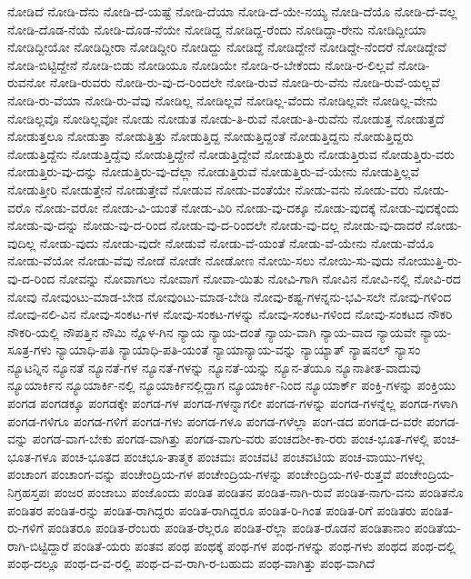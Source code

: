 {ನೋಡಿದೆ
ನೋಡಿ-ದೆನು
ನೋಡಿ-ದೆ-ಯಷ್ಟೆ
ನೋಡಿ-ದೆಯಾ
ನೋಡಿ-ದೆ-ಯೇ-ನಯ್ಯ
ನೋಡಿ-ದೆಯೊ
ನೋಡಿ-ದೆ-ವಲ್ಲ
ನೋಡಿ-ದೊಡ-ನೆಯೆ
ನೋಡಿ-ದೊಡ-ನೆಯೇ
ನೋಡಿದ್ದ
ನೋಡಿದ್ದ-ರೆಂದು
ನೋಡಿದ್ದಾ-ರೇನು
ನೋಡಿದ್ದೀಯಾ
ನೋಡಿದ್ದೀಯೋ
ನೋಡಿದ್ದೀರಾ
ನೋಡಿದ್ದೀರಿ
ನೋಡಿದ್ದು
ನೋಡಿದ್ದೆ
ನೋಡಿದ್ದೇನೆ
ನೋಡಿದ್ದೇ-ನೆಂದರೆ
ನೋಡಿದ್ದೇವೆ
ನೋಡಿ-ಬಿಟ್ಟಿದ್ದೇನೆ
ನೋಡಿ-ಬಿಡು
ನೋಡಿಯೂ
ನೋಡಿಯೇ
ನೋಡಿ-ರ-ಬೇಕೆಂದು
ನೋಡಿ-ರ-ಲಿಲ್ಲವೆ
ನೋಡಿ-ರುವನೋ
ನೋಡಿ-ರುವರು
ನೋಡಿ-ರು-ವು-ದ-ರಿಂದಲೇ
ನೋಡಿ-ರುವೆ
ನೋಡಿ-ರು-ವೆನು
ನೋಡಿ-ರುವೆ-ಯಲ್ಲವೆ
ನೋಡಿ-ರು-ವೆಯಾ
ನೋಡಿ-ರು-ವೆವು
ನೋಡಿಲ್ಲ
ನೋಡಿಲ್ಲವೆ
ನೋಡಿಲ್ಲ-ವೆಂದು
ನೋಡಿಲ್ಲವೇ
ನೋಡಿಲ್ಲ-ವೇನು
ನೋಡಿಲ್ಲವೊ
ನೋಡಿಲ್ಲವೋ
ನೋಡು
ನೋಡುತ
ನೋಡು-ತಿ-ರುವೆ
ನೋಡು-ತಿ-ರುವೆನು
ನೋಡುತ್ತ
ನೋಡುತ್ತದೆ
ನೋಡುತ್ತಲೂ
ನೋಡುತ್ತಾ
ನೋಡುತ್ತಿತ್ತು
ನೋಡುತ್ತಿದ್ದ
ನೋಡುತ್ತಿದ್ದಂತೆ
ನೋಡುತ್ತಿದ್ದನು
ನೋಡುತ್ತಿದ್ದರು
ನೋಡುತ್ತಿದ್ದೆನು
ನೋಡುತ್ತಿದ್ದೆವು
ನೋಡುತ್ತಿದ್ದೇನೆ
ನೋಡುತ್ತಿದ್ದೇವೆ
ನೋಡುತ್ತಿರು
ನೋಡುತ್ತಿರುವ
ನೋಡುತ್ತಿರು-ವರು
ನೋಡುತ್ತಿರು-ವು-ದನ್ನು
ನೋಡುತ್ತಿರು-ವು-ದೆಲ್ಲಾ
ನೋಡುತ್ತಿರುವೆ
ನೋಡುತ್ತಿರು-ವೆ-ಯೇನು
ನೋಡುತ್ತಿಲ್ಲವೆ
ನೋಡುತ್ತೀರಿ
ನೋಡುತ್ತೇನೆ
ನೋಡುತ್ತೇವೆ
ನೋಡುವ
ನೋಡು-ವಂತೆಯೇ
ನೋಡು-ವನು
ನೋಡು-ವರು
ನೋಡು-ವರೊ
ನೋಡು-ವರೋ
ನೋಡು-ವಿ-ಯಂತೆ
ನೋಡು-ವಿರಿ
ನೋಡು-ವು-ದಕ್ಕೂ
ನೋಡು-ವುದಕ್ಕೆ
ನೋಡು-ವುದಕ್ಕೆಂದು
ನೋಡು-ವು-ದನ್ನು
ನೋಡು-ವು-ದ-ರಿಂದ
ನೋಡು-ವು-ದ-ರಿಂದಲೇ
ನೋಡು-ವು-ದಲ್ಲ
ನೋಡು-ವು-ದಾದರೆ
ನೋಡು-ವುದಿಲ್ಲ
ನೋಡು-ವುದು
ನೋಡು-ವುದೇ
ನೋಡುವೆ
ನೋಡು-ವೆ-ಯಂತೆ
ನೋಡು-ವೆ-ಯೇನು
ನೋಡು-ವೆಯೊ
ನೋಡು-ವೆಯೋ
ನೋಡು-ವೆವು
ನೋಡೆ
ನೋಡೇ
ನೋಡೋಣ
ನೋಯಿ-ಸಲು
ನೋಯಿ-ಸು-ವುದು
ನೋಯುತ್ತಿ-ರು-ವು-ದ-ರಿಂದ
ನೋವನ್ನು
ನೋವಾಗಲು
ನೋವಾಗೆ
ನೋವಾ-ಯಿತು
ನೋವಿ-ಗಾಗಿ
ನೋವಿನ
ನೋವಿ-ನಲ್ಲಿ
ನೋವಿ-ರದ
ನೋವು
ನೋವುಂಟು-ಮಾಡ-ಬೇಡ
ನೋವುಂಟು-ಮಾಡ-ಬೇಡಿ
ನೋವು-ಕಷ್ಟ-ಗಳನ್ನನು-ಭವಿ-ಸಲೇ
ನೋವು-ಗಳಿಂದ
ನೋವು-ನಲಿ-ವಿನ
ನೋವು-ಸಂಕಟ-ಗಳ
ನೋವು-ಸಂಕಟ-ಗಳನ್ನು
ನೋವು-ಸಂಕಟ-ಗಳಿಂದ
ನೋವು-ಸಂಕಟದ
ನೌಕರಿ
ನೌಕರಿ-ಯಲ್ಲಿ
ನೌಪತ್ತಿನ
ನೌಮಿ
ನ್ನೊಳ-ಗಿನ
ನ್ಯಾಯ
ನ್ಯಾಯ-ದಂತೆ
ನ್ಯಾಯ-ವಾಗಿ
ನ್ಯಾಯ-ವಾದ
ನ್ಯಾಯವೇ
ನ್ಯಾಯ-ಸೂತ್ರ-ಗಳು
ನ್ಯಾಯಾಧಿ-ಪತಿ
ನ್ಯಾಯಾಧಿ-ಪತಿ-ಯಂತೆ
ನ್ಯಾಯಾನ್ಯಾಯ-ವನ್ನು
ನ್ಯಾಯ್ಯಾತ್
ನ್ಯಾಷನಲ್
ನ್ಯಾಸಂ
ನ್ಯೂಟನ್ನಿನ
ನ್ಯೂನತೆ
ನ್ಯೂನತೆ-ಗಳ
ನ್ಯೂನತೆ-ಗಳನ್ನು
ನ್ಯೂನತೆ-ಯನ್ನು
ನ್ಯೂನ-ತೆಯೂ
ನ್ಯೂನಾತೀತ-ವಾದುವು
ನ್ಯೂಯಾರ್ಕಿನ
ನ್ಯೂಯಾರ್ಕಿ-ನಲ್ಲಿ
ನ್ಯೂಯಾರ್ಕಿನಲ್ಲಿದ್ದಾಗ
ನ್ಯೂಯಾರ್ಕಿ-ನಿಂದ
ನ್ಯೂಯಾರ್ಕ್
ಪಂಕ್ತಿ-ಗಳನ್ನು
ಪಂಕ್ತಿಯು
ಪಂಗಡ
ಪಂಗಡಕ್ಕೂ
ಪಂಗಡಕ್ಕೇ
ಪಂಗಡ-ಗಳ
ಪಂಗಡ-ಗಳನ್ನಾಗಲೀ
ಪಂಗಡ-ಗಳನ್ನು
ಪಂಗಡ-ಗಳನ್ನೆಲ್ಲ
ಪಂಗಡ-ಗಳಾಗಿ
ಪಂಗಡ-ಗಳಿಗೂ
ಪಂಗಡ-ಗಳಿಗೆ
ಪಂಗಡ-ಗಳು
ಪಂಗಡ-ಗಳೂ
ಪಂಗಡ-ಗಳೆಲ್ಲಾ
ಪಂಗ-ಡದ
ಪಂಗಡ-ದ-ವರೇ
ಪಂಗಡ-ವನ್ನು
ಪಂಗಡ-ವಾಗ-ಬೇಕು
ಪಂಗಡ-ವಾಗಿತ್ತು
ಪಂಗಡ-ವಾಗು-ವರು
ಪಂಚದಶೀ-ಕಾ-ರರು
ಪಂಚ-ಭೂತ-ಗಳಲ್ಲಿ
ಪಂಚ-ಭೂತ-ಗಳೂ
ಪಂಚ-ಭೂತದ
ಪಂಚಭೂ-ತಾತ್ಮಕ
ಪಂಚಮಃ
ಪಂಚವಟಿ
ಪಂಚವಟಿಯ
ಪಂಚ-ವಾಯು-ಗಳಲ್ಲ
ಪಂಚಾಂಗ
ಪಂಚಾಂಗ-ವನ್ನು
ಪಂಚೇಂದ್ರಿಯ-ಗಳ
ಪಂಚೇಂದ್ರಿಯ-ಗಳನ್ನು
ಪಂಚೇಂದ್ರಿಯ-ಗಳಿ-ರುತ್ತವೆ
ಪಂಚೇಂದ್ರಿಯ-ನಿಗ್ರಹಸ್ತಪಃ
ಪಂಜರ
ಪಂಜಾಬು
ಪಂಜೊಂದು
ಪಂಡಿತ
ಪಂಡಿತನ
ಪಂಡಿತ-ನಾಗಿ-ರುವೆ
ಪಂಡಿತ-ನಾಗು-ವನು
ಪಂಡಿತನೊ
ಪಂಡಿತರ
ಪಂಡಿತ-ರನ್ನು
ಪಂಡಿತ-ರಾಗಿದ್ದರು
ಪಂಡಿತ-ರಾಗಿದ್ದರೂ
ಪಂಡಿತ-ರಿ-ಗಿಂತ
ಪಂಡಿತ-ರಿಗೆ
ಪಂಡಿತರು
ಪಂಡಿತ-ರು-ಗಳಿಗೆ
ಪಂಡಿತರೂ
ಪಂಡಿತ-ರೆಂಬರು
ಪಂಡಿತ-ರೆಲ್ಲರೂ
ಪಂಡಿತ-ರೆಲ್ಲಾ
ಪಂಡಿತ-ರೊಡನೆ
ಪಂಡಿತಾನಾಂ
ಪಂಡಿತೆಯ-ರಾಗಿ-ಬಿಟ್ಟಿದ್ದಾರೆ
ಪಂಡಿತೆ-ಯರು
ಪಂತವ
ಪಂಥ
ಪಂಥಕ್ಕೆ
ಪಂಥ-ಗಳ
ಪಂಥ-ಗಳನ್ನು
ಪಂಥ-ಗಳು
ಪಂಥದ
ಪಂಥ-ದಲ್ಲಿ
ಪಂಥ-ದಲ್ಲೂ
ಪಂಥ-ದ-ವ-ರಲ್ಲಿ
ಪಂಥ-ದ-ವ-ರಾಗಿ-ರ-ಬಹುದು
ಪಂಥ-ವಾಗಿತ್ತು
ಪಂಥ-ವಾಗಿದೆ
}
